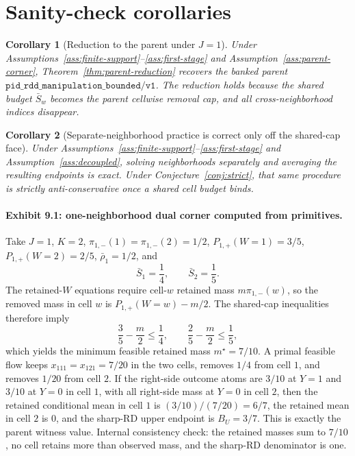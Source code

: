 \documentclass[11pt]{article}
\theoremstyle{definition}
\theoremstyle{plain}
\newtheorem{corollary}{Corollary}
\theoremstyle{remark}
\begin{document}
\section{Sanity-check corollaries}
\begin{corollary}[Reduction to the parent under \(J=1\)]\label{cor:parent}
Under Assumptions~\ref{ass:finite-support}--\ref{ass:first-stage} and
Assumption~\ref{ass:parent-corner}, Theorem~\ref{thm:parent-reduction} recovers the banked parent
\(\texttt{pid\_rdd\_manipulation\_bounded}/\texttt{v1}\). The reduction holds because the shared
budget \(\bar S_w\) becomes the parent cellwise removal cap, and all cross-neighborhood indices
disappear.
\end{corollary}

\begin{corollary}[Separate-neighborhood practice is correct only off the shared-cap face]\label{cor:separate}
Under Assumptions~\ref{ass:finite-support}--\ref{ass:first-stage} and
Assumption~\ref{ass:decoupled}, solving neighborhoods separately and averaging the resulting
endpoints is exact. Under Conjecture~\ref{conj:strict}, that same procedure is strictly
anti-conservative once a shared cell budget binds.
\end{corollary}

\paragraph{Exhibit 9.1: one-neighborhood dual corner computed from primitives.}
Take \(J=1\), \(K=2\), \(\pi_{1,-}(1)=\pi_{1,-}(2)=1/2\), \(P_{1,+}(W=1)=3/5\),
\(P_{1,+}(W=2)=2/5\), \(\bar\rho_1=1/2\), and
\[
  \bar S_1=\frac14, \qquad \bar S_2=\frac15 .
\]
The retained-\(W\) equations require cell-\(w\) retained mass \(m\pi_{1,-}(w)\), so the removed
mass in cell \(w\) is \(P_{1,+}(W=w)-m/2\). The shared-cap inequalities therefore imply
\[
  \frac35-\frac m2\le \frac14, \qquad \frac25-\frac m2\le \frac15,
\]
which yields the minimum feasible retained mass \(m^\star=7/10\). A primal feasible flow keeps
\(x_{111}=x_{121}=7/20\) in the two cells, removes \(1/4\) from cell \(1\), and removes \(1/20\)
from cell \(2\). If the right-side outcome atoms are \(3/10\) at \(Y=1\) and \(3/10\) at \(Y=0\)
in cell \(1\), with all right-side mass at \(Y=0\) in cell \(2\), then the retained conditional
mean in cell \(1\) is \((3/10)/(7/20)=6/7\), the retained mean in cell \(2\) is \(0\), and the
sharp-RD upper endpoint is \(B_U=3/7\). This is exactly the parent witness value. Internal
consistency check: the retained masses sum to \(7/10\), no cell retains more than observed mass,
and the sharp-RD denominator is one.
\end{document}
